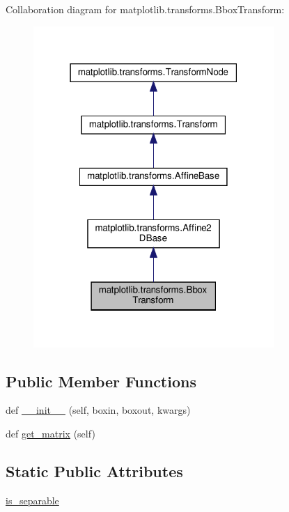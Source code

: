 Collaboration diagram for matplotlib.\+transforms.\+Bbox\+Transform\+:
\nopagebreak
\begin{figure}[H]
\begin{center}
\leavevmode
\includegraphics[width=259pt]{classmatplotlib_1_1transforms_1_1BboxTransform__coll__graph}
\end{center}
\end{figure}
\subsection*{Public Member Functions}
\begin{DoxyCompactItemize}
\item 
def \hyperlink{classmatplotlib_1_1transforms_1_1BboxTransform_a0e38270441580220e2454a094a6409ef}{\+\_\+\+\_\+init\+\_\+\+\_\+} (self, boxin, boxout, kwargs)
\item 
def \hyperlink{classmatplotlib_1_1transforms_1_1BboxTransform_af6a7fc4abbbd2b427512ea65fdd501cf}{get\+\_\+matrix} (self)
\end{DoxyCompactItemize}
\subsection*{Static Public Attributes}
\begin{DoxyCompactItemize}
\item 
\hyperlink{classmatplotlib_1_1transforms_1_1BboxTransform_a0dc283b09909206424ef639421d14203}{is\+\_\+separable}
\end{DoxyCompactItemize}


